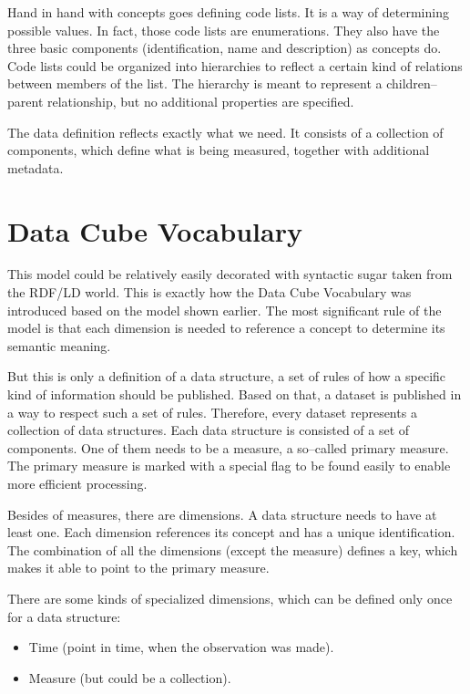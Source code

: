 Hand in hand with concepts goes defining code lists. It is a way of determining possible
values. In fact, those code lists are enumerations. They also have the three basic components
(identification, name and description) as concepts do. Code lists could be organized into
hierarchies to reflect a certain kind of relations between members of the list. The hierarchy
is meant to represent a children--parent relationship, but no additional properties are specified.

The data definition reflects exactly what we need. It consists of a collection of 
components, which define what is being measured, together with additional metadata.

\section{Data Cube Vocabulary}
\label{datacube-vocabulary}

This model could be relatively easily decorated with syntactic sugar taken from the
RDF/LD world. This is exactly how the Data Cube Vocabulary was introduced based
on the model shown earlier. The most significant rule of the model is that each
dimension is needed to reference a concept to determine its semantic meaning.

But this is only a definition of a data structure, a set of rules of how a specific kind of information
should be published. Based on that, a dataset is published in a way to respect such a set
of rules. Therefore, every dataset represents a collection of data structures. Each data
structure is consisted of a set of components. One of them needs to be a measure,
a so--called primary measure. The primary measure is marked with a special flag to be found
easily to enable more efficient processing.

Besides of measures, there are dimensions. A data structure needs to have at least one.
Each dimension references its concept and has a unique identification. The combination of
all the dimensions (except the measure) defines a key, which makes it able to point
to the primary measure.

There are some kinds of specialized dimensions, which can be defined only once
for a data structure:

\begin{itemize}
\item Time (point in time, when the observation was made).
\item Measure (but could be a collection).
\end{itemize}

